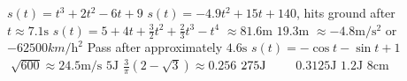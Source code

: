 \begin{Answer}[ref={exApp}]
\Question%
$s (t) =t^{3} +2 t^{2} -6 t +9$ 
\Question%
$s (t) = -4.9 t^{2} +15 t +140$, hits ground after\\
 $t \approx 7.1 \mbox{s}$
\Question%
$s (t) =5 +4 t +\frac{3}{2} t^{2} +\frac{2}{3} t^{3} -t^{4}$
\Question%
$ \approx 81.6 \mbox{m}$ 
\Question%
$19.3 \mbox{m}$ 
\Question%
$ \approx  -4.8 \mathrm{m}/\mathrm{s}^{2}$ or $ -62500 km/\mathrm{h}^{2}$
\Question%
Pass after approximately $4.6 \mbox{s}$ 
\Question%
$s (t) = -\cos  t -\sin  t +1$ 
\Question%
$\;\sqrt{600} \approx 24.5 \mathrm{m}/\mbox{s}$
\Question%
$5 \mbox{J}$ 
\Question%
$\frac{3}{\pi } \left (2 -\sqrt{3}\right ) \approx 0.256$
\Question %
$275 \mbox{J}\text{\quad \quad }$
\Question %
$0.3125 \mbox{J}$ 
\Question%
$1.2 \mbox{J}$
\Question%
$8 \mbox{cm}$

\end{Answer}%
